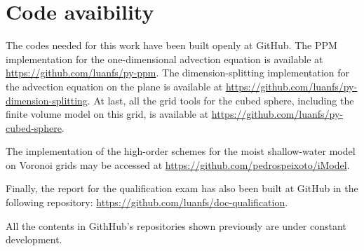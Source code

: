 \chapter{Code avaibility}
\label{anexo-sph}

The codes needed for this work have been built openly at GitHub. 
The PPM implementation for the one-dimensional advection equation is available 
at \url{https://github.com/luanfs/py-ppm}.
The dimension-splitting implementation for the advection equation on the plane 
is available at \url{https://github.com/luanfs/py-dimension-splitting}.
At last, all the grid tools for the cubed sphere, including the finite volume
model on this grid, is available at \url{https://github.com/luanfs/py-cubed-sphere}.

The implementation of the high-order schemes for the moist shallow-water model
on Voronoi grids may be accessed at
\url{https://github.com/pedrospeixoto/iModel}.

Finally, the report for the qualification exam has also been built at  GitHub in the following  repository:
\url{https://github.com/luanfs/doc-qualification}.

All the contents in GithHub's repositories shown previously are under constant development.

